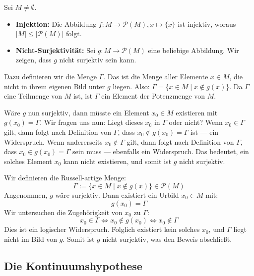 \begin{math-stroke}
Sei $M \neq \emptyset$.
\begin{itemize}
    \item \textbf{Injektion:} Die Abbildung $f \colon M \to \mathcal{P}(M), x \mapsto \{x\}$ ist injektiv, woraus $|M| \le |\mathcal{P}(M)|$ folgt.
    \item \textbf{Nicht-Surjektivität:} Sei $g \colon M \to \mathcal{P}(M)$ eine beliebige Abbildung. Wir zeigen, dass $g$ nicht surjektiv sein kann.
\end{itemize}
\end{math-stroke}

\begin{spoken-clean}[01:02:29 - 01:03:23]
Dazu definieren wir die Menge $\Gamma$. Das ist die Menge aller Elemente $x \in M$, die nicht in ihrem eigenen Bild unter $g$ liegen. Also: $\Gamma = \{ x \in M \mid x \notin g(x) \}$. Da $\Gamma$ eine Teilmenge von $M$ ist, ist $\Gamma$ ein Element der Potenzmenge von $M$.

Wäre $g$ nun surjektiv, dann müsste ein Element $x_0 \in M$ existieren mit $g(x_0) = \Gamma$. Wir fragen uns nun: Liegt dieses $x_0$ in $\Gamma$ oder nicht? Wenn $x_0 \in \Gamma$ gilt, dann folgt nach Definition von $\Gamma$, dass $x_0 \notin g(x_0) = \Gamma$ ist --- ein Widerspruch. Wenn andererseits $x_0 \notin \Gamma$ gilt, dann folgt nach Definition von $\Gamma$, dass $x_0 \in g(x_0) = \Gamma$ sein muss --- ebenfalls ein Widerspruch. Das bedeutet, ein solches Element $x_0$ kann nicht existieren, und somit ist $g$ nicht surjektiv.
\end{spoken-clean}

\begin{math-stroke}
Wir definieren die Russell-artige Menge:
\[
\Gamma := \{ x \in M \mid x \notin g(x) \} \in \mathcal{P}(M)
\]
Angenommen, $g$ wäre surjektiv. Dann existiert ein Urbild $x_0 \in M$ mit:
\[
g(x_0) = \Gamma
\]
Wir untersuchen die Zugehörigkeit von $x_0$ zu $\Gamma$:
\[
x_0 \in \Gamma \iff x_0 \notin g(x_0) \iff x_0 \notin \Gamma
\]
Dies ist ein logischer Widerspruch. Folglich existiert kein solches $x_0$, und $\Gamma$ liegt nicht im Bild von $g$. Somit ist $g$ nicht surjektiv, was den Beweis abschließt.
\end{math-stroke}

\subsection{Die Kontinuumshypothese}

